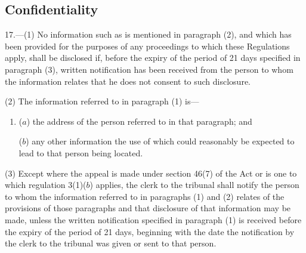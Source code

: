 \documentclass[12pt,a4paper]{article}
\begin{document}
%
%
%

\subsection[17. Confidentiality]{Confidentiality}

17.—(1) No information such as is mentioned in paragraph (2), and which has been provided for the purposes of any proceedings to which these Regulations apply, shall be disclosed if, before the expiry of the period of 21 days specified in paragraph (3), written notification has been received from the person to whom the information relates that he does not consent to such disclosure.

(2) The information referred to in paragraph (1) is—
\begin{enumerate}\item[]
($a$) the address of the person referred to in that paragraph; and

($b$) any other information the use of which could reasonably be expected to lead to that person being located.
\end{enumerate}

(3) Except where the appeal is made under section 46(7) of the Act or is one to which regulation 3(1)($b$) applies, the clerk to the tribunal shall notify the person to whom the information referred to in paragraphs (1) and (2) relates of the provisions of those paragraphs and that disclosure of that information may be made, unless the written notification specified in paragraph (1) is received before the expiry of the period of 21 days, beginning with the date the notification by the clerk to the tribunal was given or sent to that person.
\end{document}
